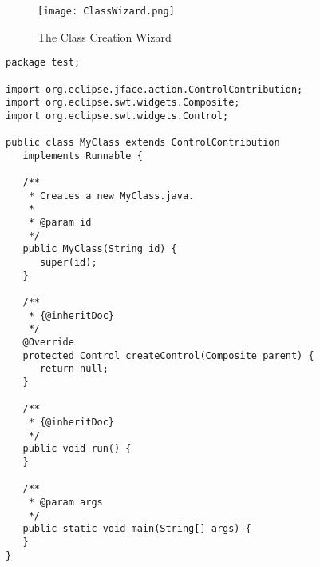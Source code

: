 \begin{figure}[ClassWizard]
  \centering
  \texttt{[image: ClassWizard.png]}
  \caption[The Class Creation Wizard]%
  {The Class Creation Wizard\protect}
  \label{fig:ClassWizard}
\end{figure}

\begin{lstlisting}
package test;

import org.eclipse.jface.action.ControlContribution;
import org.eclipse.swt.widgets.Composite;
import org.eclipse.swt.widgets.Control;

public class MyClass extends ControlContribution 
   implements Runnable {

   /**
    * Creates a new MyClass.java.
    * 
    * @param id
    */
   public MyClass(String id) {
      super(id);
   }

   /**
    * {@inheritDoc}
    */
   @Override
   protected Control createControl(Composite parent) {
      return null;
   }

   /**
    * {@inheritDoc}
    */
   public void run() {
   }

   /**
    * @param args
    */
   public static void main(String[] args) {
   }
}
\end{lstlisting}

